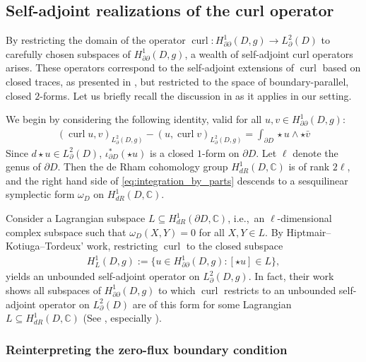 \documentclass[11pt,reqno]{amsart}
\DeclareMathOperator{\curl}{curl}
\newcommand{\hodge}{\!\star\!}
\begin{document}
\subsection{Self-adjoint realizations of the curl operator}
\label{subsec:self-adjoint-realizations}

By restricting the domain of the operator $\curl: H^1_{\partial\partial}(D,g) \to L^2_\partial(D)$ to carefully chosen subspaces of $H^1_{\partial\partial}(D,g)$, a wealth of self-adjoint curl operators arises. These operators correspond to the self-adjoint extensions of $\curl$ based on closed traces, as presented in \cite{HiptmairKotiugaTordeux2012}, but restricted to the space of boundary-parallel, closed $2$-forms. Let us briefly recall the discussion in \cite{HiptmairKotiugaTordeux2012} as it applies in our setting.

We begin by considering the following identity, valid for all $u,v \in H^1_{\partial\partial}(D,g)$:
\begin{align}
    \label{eq:integration_by_parts}
    \left(\curl u, v\right)_{L^2_\partial(D,g)} - \left(u, \curl v\right)_{L^2_\partial(D,g)} = \int_{\partial D} \star u \wedge \star \bar v
\end{align}
Since $d\hodge u \in L^2_\partial(D)$, $\iota_{\partial D}^\ast(\star u)$ is a closed $1$-form on $\partial D$. Let $\ell$ denote the genus of $\partial D$. Then the de Rham cohomology group $H^1_{dR}(D,\mathbb C)$ is of rank $2\ell$, and the right hand side of \eqref{eq:integration_by_parts} descends to a sesquilinear symplectic form $\omega_D$ on $H^1_{dR}(D,\mathbb C)$.

Consider a Lagrangian subspace $L \subseteq H^1_{dR}(\partial D,\mathbb C)$, i.e.,\ an $\ell$-dimensional complex subspace such that $\omega_D(X,Y) = 0$ for all $X,Y \in L$. By Hiptmair--Kotiuga--Tordeux' work, restricting $\curl$ to the closed subspace
\begin{align*}
    H^1_L(D,g) := \{u \in H^1_{\partial\partial}(D,g): [\star u] \in L\},
\end{align*}
yields an unbounded self-adjoint operator on $L^2_\partial(D,g)$. In fact, their work shows all subspaces of $H^1_{\partial\partial}(D,g)$ to which $\curl$ restricts to an unbounded self-adjoint operator on $L^2_\partial(D)$ are of this form for some Lagrangian $L \subseteq H^1_{dR}(D,\mathbb C)$ (See \cite[Section 6]{HiptmairKotiugaTordeux2012}, especially \cite[Theorem 6.4]{HiptmairKotiugaTordeux2012}).

\subsubsection{Reinterpreting the zero-flux boundary condition}
\label{sec:zero_flux_reinterpretation}
\end{document}
